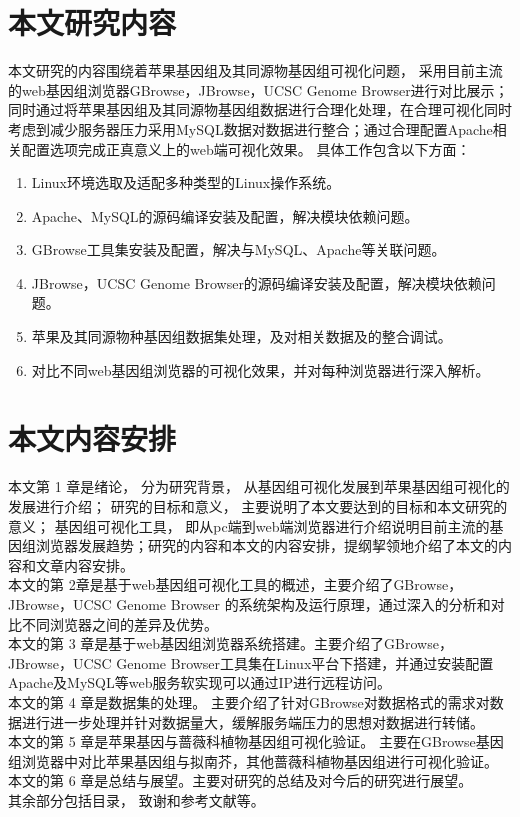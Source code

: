 	\section{本文研究内容}
	本文研究的内容围绕着苹果基因组及其同源物基因组可视化问题， 采用目前主流的web基因组浏览器GBrowse，JBrowse，UCSC Genome Browser进行对比展示；同时通过将苹果基因组及其同源物基因组数据进行合理化处理，在合理可视化同时考虑到减少服务器压力采用MySQL数据对数据进行整合；通过合理配置Apache相关配置选项完成正真意义上的web端可视化效果。 具体工作包含以下方面：
	\begin{enumerate}
		\item Linux环境选取及适配多种类型的Linux操作系统。 
		\item  Apache、MySQL的源码编译安装及配置，解决模块依赖问题。
		\item  GBrowse工具集安装及配置，解决与MySQL、Apache等关联问题。
		\item  JBrowse，UCSC Genome Browser的源码编译安装及配置，解决模块依赖问题。
		\item 苹果及其同源物种基因组数据集处理，及对相关数据及的整合调试。
		\item 对比不同web基因组浏览器的可视化效果，并对每种浏览器进行深入解析。
	\end{enumerate}
	
	\section{本文内容安排}
	本文第 1 章是绪论， 分为研究背景， 从基因组可视化发展到苹果基因组可视化的发展进行介绍； 研究的目标和意义， 主要说明了本文要达到的目标和本文研究的意义； 基因组可视化工具， 即从pc端到web端浏览器进行介绍说明目前主流的基因组浏览器发展趋势；研究的内容和本文的内容安排，提纲挈领地介绍了本文的内容和文章内容安排。\\
	\indent 本文的第 2章是基于web基因组可视化工具的概述，主要介绍了GBrowse，JBrowse，UCSC Genome Browser 的系统架构及运行原理，通过深入的分析和对比不同浏览器之间的差异及优势。\\
	\indent 本文的第 3 章是基于web基因组浏览器系统搭建。主要介绍了GBrowse，JBrowse，UCSC Genome Browser工具集在Linux平台下搭建，并通过安装配置Apache及MySQL等web服务软实现可以通过IP进行远程访问。\\
	\indent 本文的第 4 章是数据集的处理。 主要介绍了针对GBrowse对数据格式的需求对数据进行进一步处理并针对数据量大，缓解服务端压力的思想对数据进行转储。\\
	\indent 本文的第 5 章是苹果基因与蔷薇科植物基因组可视化验证。 主要在GBrowse基因组浏览器中对比苹果基因组与拟南芥，其他蔷薇科植物基因组进行可视化验证。\\
	\indent 本文的第 6 章是总结与展望。主要对研究的总结及对今后的研究进行展望。\\
	\indent 其余部分包括目录， 致谢和参考文献等。